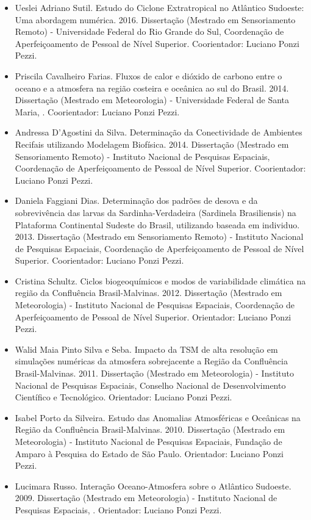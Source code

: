 \documentclass[11pt, a4paper]{awesome-cv}
\begin{document}
\begin{cvletter}
\begin{itemize}
  \item[] Ueslei Adriano Sutil. Estudo do Ciclone Extratropical no Atlântico Sudoeste: Uma abordagem numérica. 2016. Dissertação (Mestrado em Sensoriamento Remoto) - Universidade Federal do Rio Grande do Sul, Coordenação de Aperfeiçoamento de Pessoal de Nível Superior. Coorientador: Luciano Ponzi Pezzi. 
  \item[] Priscila Cavalheiro Farias. Fluxos de calor e dióxido de carbono entre o oceano e a atmosfera na região costeira e oceânica ao sul do Brasil. 2014. Dissertação (Mestrado em Meteorologia) - Universidade Federal de Santa Maria, . Coorientador: Luciano Ponzi Pezzi. 
  \item[] Andressa D'Agostini da Silva. Determinação da Conectividade de Ambientes Recifais utilizando Modelagem Biofísica. 2014. Dissertação (Mestrado em Sensoriamento Remoto) - Instituto Nacional de Pesquisas Espaciais, Coordenação de Aperfeiçoamento de Pessoal de Nível Superior. Coorientador: Luciano Ponzi Pezzi. 
  \item[] Daniela Faggiani Dias. Determinação dos padrões de desova e da sobrevivência das larvas da Sardinha-Verdadeira (Sardinela Brasiliensis) na Plataforma Continental Sudeste do Brasil, utilizando baseada em individuo. 2013. Dissertação (Mestrado em Sensoriamento Remoto) - Instituto Nacional de Pesquisas Espaciais, Coordenação de Aperfeiçoamento de Pessoal de Nível Superior. Coorientador: Luciano Ponzi Pezzi. 
  \item[] Cristina Schultz. Ciclos biogeoquímicos e modos de variabilidade climática na região da Confluência Brasil-Malvinas. 2012. Dissertação (Mestrado em Meteorologia) - Instituto Nacional de Pesquisas Espaciais, Coordenação de Aperfeiçoamento de Pessoal de Nível Superior. Orientador: Luciano Ponzi Pezzi. 
  \item[] Walid Maia Pinto Silva e Seba. Impacto da TSM de alta resolução em simulações numéricas da atmosfera sobrejacente a Região da Confluência Brasil-Malvinas. 2011. Dissertação (Mestrado em Meteorologia) - Instituto Nacional de Pesquisas Espaciais, Conselho Nacional de Desenvolvimento Científico e Tecnológico. Orientador: Luciano Ponzi Pezzi. 
  \item[] Isabel Porto da Silveira. Estudo das Anomalias Atmosféricas e Oceânicas na Região da Confluência Brasil-Malvinas. 2010. Dissertação (Mestrado em Meteorologia) - Instituto Nacional de Pesquisas Espaciais, Fundação de Amparo à Pesquisa do Estado de São Paulo. Orientador: Luciano Ponzi Pezzi. 
  \item[] Lucimara Russo. Interação Oceano-Atmosfera sobre o Atlântico Sudoeste. 2009. Dissertação (Mestrado em Meteorologia) - Instituto Nacional de Pesquisas Espaciais, . Orientador: Luciano Ponzi Pezzi. 

\end{itemize}
\end{cvletter}
\end{document}
